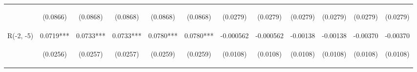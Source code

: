 \documentclass[]{article}
\begin{document}
\begin{center}
\begin{tabular}{lccccccccccc}
\vspace{4pt} & \begin{footnotesize}(0.0866)\end{footnotesize} & \begin{footnotesize}(0.0868)\end{footnotesize} & \begin{footnotesize}(0.0868)\end{footnotesize} & \begin{footnotesize}(0.0868)\end{footnotesize} & \begin{footnotesize}(0.0868)\end{footnotesize} & \begin{footnotesize}(0.0279)\end{footnotesize} & \begin{footnotesize}(0.0279)\end{footnotesize} & \begin{footnotesize}(0.0279)\end{footnotesize} & \begin{footnotesize}(0.0279)\end{footnotesize} & \begin{footnotesize}(0.0279)\end{footnotesize} & \begin{footnotesize}(0.0279)\end{footnotesize} \\
R(-2, -5) & 0.0719*** & 0.0733*** & 0.0733*** & 0.0780*** & 0.0780*** & -0.000562 & -0.000562 & -0.00138 & -0.00138 & -0.00370 & -0.00370 \\
\vspace{4pt} & \begin{footnotesize}(0.0256)\end{footnotesize} & \begin{footnotesize}(0.0257)\end{footnotesize} & \begin{footnotesize}(0.0257)\end{footnotesize} & \begin{footnotesize}(0.0259)\end{footnotesize} & \begin{footnotesize}(0.0259)\end{footnotesize} & \begin{footnotesize}(0.0108)\end{footnotesize} & \begin{footnotesize}(0.0108)\end{footnotesize} & \begin{footnotesize}(0.0108)\end{footnotesize} & \begin{footnotesize}(0.0108)\end{footnotesize} & \begin{footnotesize}(0.0108)\end{footnotesize} & \begin{footnotesize}(0.0108)\end{footnotesize} \\

\end{tabular}
\end{center}
\end{document}
